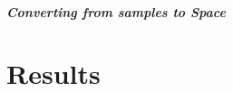 \documentclass{UoYCSproject}
\begin{document}
\paragraph{Converting from samples to Space}

\chapter{Results}
\label{cha:results}
\end{document}

